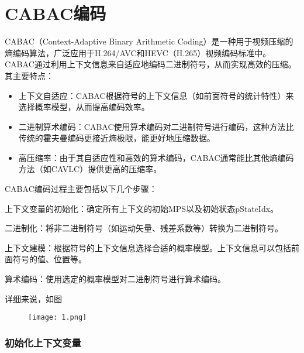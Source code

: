 \documentclass{/Users/hi/Study/template/code}
\begin{document}
\section{CABAC编码}
CABAC（Context-Adaptive Binary Arithmetic Coding）是一种用于视频压缩的熵编码算法，广泛应用于H.264/AVC和HEVC（H.265）视频编码标准中。CABAC通过利用上下文信息来自适应地编码二进制符号，从而实现高效的压缩。其主要特点：
\begin{itemize}
	\item 上下文自适应：CABAC根据符号的上下文信息（如前面符号的统计特性）来选择概率模型，从而提高编码效率。
	\item 二进制算术编码：CABAC使用算术编码对二进制符号进行编码，这种方法比传统的霍夫曼编码更接近熵极限，能更好地压缩数据。
	\item 高压缩率：由于其自适应性和高效的算术编码，CABAC通常能比其他熵编码方法（如CAVLC）提供更高的压缩率。
\end{itemize}

CABAC编码过程主要包括以下几个步骤：
\begin{serialNumber}
	\item 上下文变量的初始化：确定所有上下文的初始MPS以及初始状态pStateIdx。
	\item 二进制化：将非二进制符号（如运动矢量、残差系数等）转换为二进制符号。
	\item 上下文建模：根据符号的上下文信息选择合适的概率模型。上下文信息可以包括前面符号的值、位置等。
	\item 算术编码：使用选定的概率模型对二进制符号进行算术编码。
\end{serialNumber}
详细来说，如图
\begin{figure}[H]
	\centering
	\texttt{[image: 1.png]}
	\caption{}
	\label{fig:}
\end{figure}



\subsubsection{初始化上下文变量}
%
%
%
\end{document}
